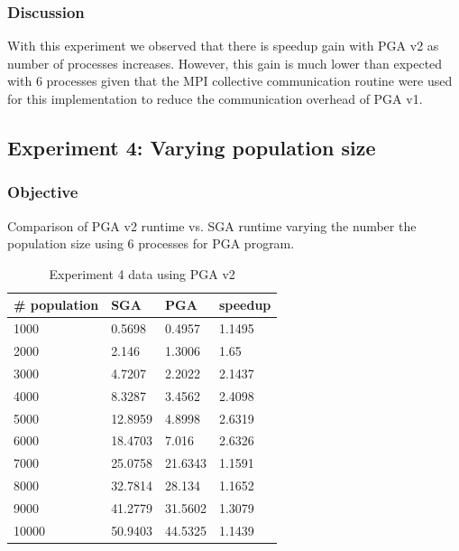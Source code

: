 \subsubsection{Discussion}
With this experiment we observed that there is speedup gain with PGA v2 as number of processes increases. However, this gain is much lower than expected with 6 processes given that the MPI collective communication routine were used for this implementation to reduce the communication overhead of PGA v1.

\subsection{Experiment 4: Varying population size}

\subsubsection{Objective}
Comparison of PGA v2 runtime vs. SGA runtime varying the number the population size using 6 processes for PGA program.

\begin{table}[H]
\centering
\caption{Experiment 4 data using PGA v2}
\label{tab:pga2_pop}
\begin{tabular}{|l|l|l|l|}
\hline
\# population & SGA     & PGA     & speedup \\ \hline
1000          & 0.5698  & 0.4957  & 1.1495  \\ \hline
2000          & 2.146   & 1.3006  & 1.65    \\ \hline
3000          & 4.7207  & 2.2022  & 2.1437  \\ \hline
4000          & 8.3287  & 3.4562  & 2.4098  \\ \hline
5000          & 12.8959 & 4.8998  & 2.6319  \\ \hline
6000          & 18.4703 & 7.016   & 2.6326  \\ \hline
7000          & 25.0758 & 21.6343 & 1.1591  \\ \hline
8000          & 32.7814 & 28.134  & 1.1652  \\ \hline
9000          & 41.2779 & 31.5602 & 1.3079  \\ \hline
10000         & 50.9403 & 44.5325 & 1.1439  \\ \hline
\end{tabular}
\end{table}

